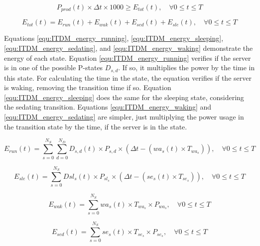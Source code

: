 \begin{equation}
    \label{equ:ITDM_energy_less_envelope}
    P_{prod}(t) \times \Delta t \times 1000 \ge E_{tot}(t), \quad \forall 0 \le t \le T
\end{equation}

\begin{equation}
    \label{equ:ITDM_energy_usage}
    E_{tot}(t) = E_{run}(t) + E_{wak}(t) + E_{sed}(t) + E_{sle}(t), \quad \forall 0 \le t \le T
\end{equation}

Equations \ref{equ:ITDM_energy_running}, \ref{equ:ITDM_energy_sleeping}, \ref{equ:ITDM_energy_sedating}, and \ref{equ:ITDM_energy_waking} demonstrate the energy of each state. Equation \ref{equ:ITDM_energy_running} verifies if the server is in one of the possible P-states $D_{s,d}$. If so, it multiplies the power by the time in this state. For calculating the time in the state, the equation verifies if the server is waking, removing the transition time if so. Equation \ref{equ:ITDM_energy_sleeping} does the same for the sleeping state, considering the sedating transition. Equations \ref{equ:ITDM_energy_waking} and \ref{equ:ITDM_energy_sedating} are simpler, just multiplying the power usage in the transition state by the time, if the server is in the state.

\begin{equation}
    \label{equ:ITDM_energy_running}
    E_{run}(t) = \sum_{s=0}^{N_{S}}\sum_{d=0}^{N_{D}} D_{s,d}(t) \times P_{s,d} \times (\Delta t - (wa_{s}(t) \times T_{wa_{s}})), \quad \forall 0 \le t \le T
\end{equation}

\begin{equation}
    \label{equ:ITDM_energy_sleeping}
    E_{sle}(t) = \sum_{s=0}^{N_{S}} Dsl_{s}(t) \times P_{sl_{s}} \times (\Delta t - (se_{s}(t) \times T_{se_{s}})), \quad \forall 0 \le t \le T
\end{equation}

\begin{equation}
    \label{equ:ITDM_energy_waking}
    E_{wak}(t) = \sum_{s=0}^{N_{S}} wa_{s}(t) \times T_{wa_{s}} \times P_{wa_{s}}, \quad \forall 0 \le t \le T
\end{equation}

\begin{equation}
    \label{equ:ITDM_energy_sedating}
    E_{sed}(t) = \sum_{s=0}^{N_{S}} se_{s}(t) \times T_{se_{s}} \times P_{se_{s}}, \quad \forall 0 \le t \le T
\end{equation}

